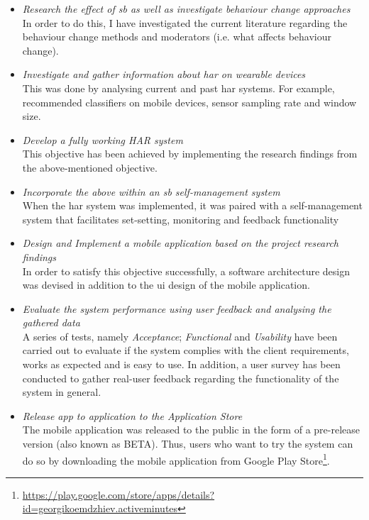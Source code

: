 \begin{itemize}
    \item \textit{Research the effect of \gls{sb} as well as investigate behaviour change approaches}\\
    In order to do this, I have investigated the current literature regarding the behaviour change methods and moderators (i.e. what affects behaviour change).
    \item \textit{Investigate and gather information about \gls{har} on wearable devices}\\
    This was done by analysing current and past \gls{har} systems. For example, recommended classifiers on mobile devices, sensor sampling rate and window size.
    \item \textit{Develop a fully working HAR system}\\
    This objective has been achieved by implementing the research findings from the above-mentioned objective.
    \item \textit{Incorporate the above within an \gls{sb} self-management system}\\
    When the \gls{har} system was implemented, it was paired with a self-management system that facilitates set-setting, monitoring and feedback functionality
    \item \textit{Design and Implement a mobile application based on the project research findings}\\
    In order to satisfy this objective successfully, a software architecture design was devised in addition to the \gls{ui} design of the mobile application.
    
    \item \textit{Evaluate the system performance using user feedback and analysing the gathered data}\\
    A series of tests, namely \textit{Acceptance}; \textit{Functional} and \textit{Usability} have been carried out to evaluate if the system complies with the client requirements, works as expected and is easy to use. In addition, a user survey has been conducted to gather real-user feedback regarding the functionality of the system in general.
    
    \item \textit{Release app to application to the Application Store}\\
    The mobile application was released to the public in the form of a pre-release version (also known as BETA). Thus, users who want to try the system can do so by downloading the mobile application from Google Play Store\footnote{\url{https://play.google.com/store/apps/details?id=georgikoemdzhiev.activeminutes}}.
    
\end{itemize}

